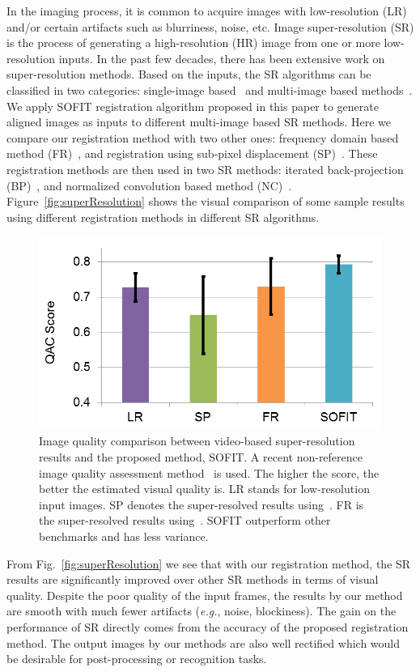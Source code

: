 \documentclass[10pt,journal]{IEEEtran}
\begin{document}
In the imaging process, it is common to acquire images with low-resolution (LR) and/or certain artifacts such as blurriness, noise, etc. Image super-resolution (SR) is the process of generating a high-resolution (HR) image from one or more low-resolution inputs. In the past few decades, there has been extensive work on super-resolution methods. Based on the inputs, the SR algorithms can be classified in two categories: single-image based~\cite{Sun_CVPR08} and multi-image based methods~\cite{Irani91}. We apply SOFIT registration algorithm proposed in this paper to generate aligned images as inputs to different multi-image based SR methods. Here we compare our registration method with two other ones: frequency domain based method (FR)~\cite{Vandewalle06}, and registration using sub-pixel displacement (SP)~\cite{Keren_CVPR88}. These registration methods are then used in two SR methods: iterated back-projection (BP)~\cite{Irani91}, and normalized convolution based method (NC)~\cite{Pham_06}. Figure~\ref{fig:superResolution} shows the visual comparison of some sample results using different registration methods in different SR algorithms.

\begin{figure}[htbp]
	\centering
		\includegraphics[width=.8\columnwidth]{fig/SR_quant.png}
	\caption{Image quality comparison between video-based super-resolution results and the proposed method, SOFIT. A recent non-reference image quality assessment method~\cite{Xue_CVPR13} is used. The higher the score, the better the estimated visual quality is. LR stands for low-resolution input images. SP denotes the super-resolved results using~\cite{Keren_CVPR88}. FR is the super-resolved results using~\cite{Vandewalle06}. SOFIT outperform other benchmarks and has less variance. }
	\label{fig:SR_quant}
\end{figure}

From Fig.~\ref{fig:superResolution} we see that with our registration method, the SR results are significantly improved over other SR methods in terms of visual quality. Despite the poor quality of the input frames, the results by our method are smooth with much fewer artifacts (\textit{e.g.}, noise, blockiness). The gain on the performance of SR directly comes from the accuracy of the proposed registration method. The output images by our methods are also well rectified which would be desirable for post-processing or recognition tasks. 
\end{document}
